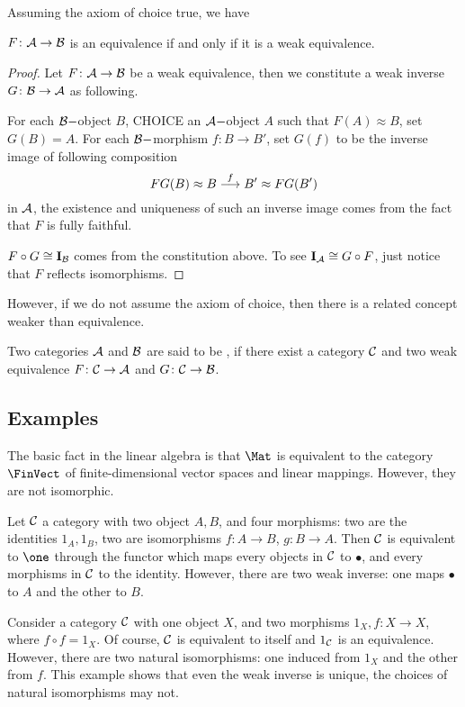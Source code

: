  Assuming the axiom of choice true, we have
  \begin{prop}
    $F\colon{\cal A}\to{\cal B}$ is an equivalence if and only if it is a weak equivalence.
  \end{prop}
  \begin{proof}
    Let $F\colon{\cal A}\to{\cal B}$ be a weak equivalence, then we constitute a weak inverse $G\colon{\cal B}\to{\cal A}$ as following.

    For each ${\cal B}-$object $B$, CHOICE an ${\cal A}-$object $A$ such that $F(A)\approx B$, set $G(B)=A$.
    For each ${\cal B}-$morphism $f\colon B\to B'$, set $G(f)$ to be the inverse image of following composition
    \begin{equation*}
      FG(B)\approx B\stackrel{{f}}{\longrightarrow} B'\approx FG(B')
    \end{equation*}
    in ${\cal A}$, the existence and uniqueness of such an inverse image comes from the fact that $F$ is fully faithful.

    $F\circ G\cong \operatorname{\mathbf{I}}_{{\cal B}}$ comes from the constitution above. To see $\operatorname{\mathbf{I}}_{{\cal A}}\cong G\circ F$, just notice that $F$ reflects isomorphisms.
  \end{proof}

  However, if we do not assume the axiom of choice, then there is a related concept weaker than equivalence.
  \begin{defn}
    Two categories ${\cal A}$ and ${\cal B}$ are said to be , if there exist a category ${\cal C}$ and two weak equivalence $F\colon{\cal C}\to{\cal A}$ and $G\colon{\cal C}\to{\cal B}$.
  \end{defn}

\subsection{Examples}
\begin{exam}
  The basic fact in the linear algebra is that $\Mat$ is equivalent to the category $\FinVect$ of finite-dimensional vector spaces and linear mappings. However, they are not isomorphic.
\end{exam}
\begin{exam}
  Let ${\cal C}$ a category with two object $A,B$, and four morphisms: two are the identities $1_A, 1_B$, two are isomorphisms $f\colon A\to B$, $g\colon B\to A$.
  Then ${\cal C}$ is equivalent to $\one$ through the functor which maps every objects in ${\cal C}$ to $\bullet$, and every morphisms in ${\cal C}$ to the identity.
  However, there are two weak inverse: one maps $\bullet$ to $A$ and the other to $B$.
\end{exam}
\begin{exam}
  Consider a category ${\cal C}$ with one object $X$, and two morphisms $1_X, f\colon X\to X$, where $f \circ f = 1_X$.
  Of course, ${\cal C}$ is equivalent to itself and $1_{{\cal C}}$ is an equivalence. However, there are two natural isomorphisms: one induced from $1_X$ and the other from $f$. This example shows that even the weak inverse is unique, the choices of natural isomorphisms may not.
\end{exam}

